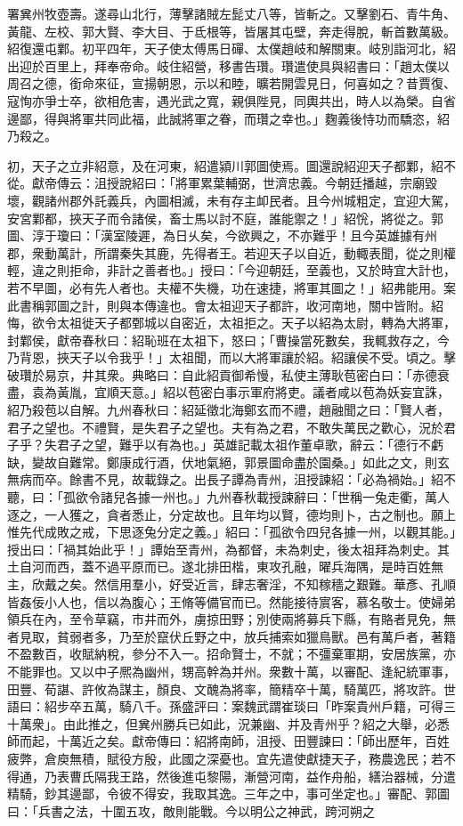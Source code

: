 \begin{pinyinscope}
署兾州牧壺壽。遂尋山北行，薄擊諸賊左髭丈八等，皆斬之。又擊劉石、青牛角、黃龍、左校、郭大賢、李大目、于氐根等，皆屠其屯壁，奔走得脫，斬首數萬級。紹復還屯鄴。初平四年，天子使太傅馬日磾、太僕趙岐和解關東。岐別詣河北，紹出迎於百里上，拜奉帝命。岐住紹營，移書告瓚。瓚遣使具與紹書曰：「趙太僕以周召之德，銜命來征，宣揚朝恩，示以和睦，曠若開雲見日，何喜如之？昔賈復、寇恂亦爭士卒，欲相危害，遇光武之寬，親俱陛見，同輿共出，時人以為榮。自省邊鄙，得與將軍共同此福，此誠將軍之眷，而瓚之幸也。」麴義後恃功而驕恣，紹乃殺之。

初，天子之立非紹意，及在河東，紹遣潁川郭圖使焉。圖還說紹迎天子都鄴，紹不從。獻帝傳云：沮授說紹曰：「將軍累葉輔弼，世濟忠義。今朝廷播越，宗廟毀壞，觀諸州郡外託義兵，內圖相滅，未有存主卹民者。且今州城粗定，宜迎大駕，安宮鄴都，挾天子而令諸侯，畜士馬以討不庭，誰能禦之！」紹恱，將從之。郭圖、淳于瓊曰：「漢室陵遲，為日乆矣，今欲興之，不亦難乎！且今英雄據有州郡，衆動萬計，所謂秦失其鹿，先得者王。若迎天子以自近，動輙表聞，從之則權輕，違之則拒命，非計之善者也。」授曰：「今迎朝廷，至義也，又於時宜大計也，若不早圖，必有先人者也。夫權不失機，功在速捷，將軍其圖之！」紹弗能用。案此書稱郭圖之計，則與本傳違也。會太祖迎天子都許，收河南地，關中皆附。紹悔，欲令太祖徙天子都鄄城以自密近，太祖拒之。天子以紹為太尉，轉為大將軍，封鄴侯，獻帝春秋曰：紹恥班在太祖下，怒曰；「曹操當死數矣，我輒救存之，今乃背恩，挾天子以令我乎！」太祖聞，而以大將軍讓於紹。紹讓侯不受。頃之。擊破瓚於易京，井其衆。典略曰：自此紹貢御希慢，私使主薄耿苞密白曰：「赤德衰盡，袁為黃胤，宜順天意。」紹以苞密白事示軍府將吏。議者咸以苞為妖妄宜誅，紹乃殺苞以自解。九州春秋曰：紹延徵北海鄭玄而不禮，趙融聞之曰：「賢人者，君子之望也。不禮賢，是失君子之望也。夫有為之君，不敢失萬民之歡心，況於君子乎？失君子之望，難乎以有為也。」英雄記載太祖作董卓歌，辭云：「德行不虧缺，變故自難常。鄭康成行酒，伏地氣絕，郭景圖命盡於園桑。」如此之文，則玄無病而卒。餘書不見，故載錄之。出長子譚為青州，沮授諫紹：「必為禍始。」紹不聽，曰：「孤欲令諸兒各據一州也。」九州春秋載授諫辭曰：「世稱一兔走衢，萬人逐之，一人獲之，貪者悉止，分定故也。且年均以賢，德均則卜，古之制也。願上惟先代成敗之戒，下思逐兔分定之義。」紹曰：「孤欲令四兒各據一州，以觀其能。」授出曰：「禍其始此乎！」譚始至青州，為都督，未為刺史，後太祖拜為刺史。其土自河而西，蓋不過平原而已。遂北排田楷，東攻孔融，曜兵海隅，是時百姓無主，欣戴之矣。然信用羣小，好受近言，肆志奢淫，不知稼穡之艱難。華彥、孔順皆姦佞小人也，信以為腹心；王脩等備官而已。然能接待賔客，慕名敬士。使婦弟領兵在內，至令草竊，巿井而外，虜掠田野；別使兩將募兵下縣，有賂者見免，無者見取，貧弱者多，乃至於竄伏丘野之中，放兵捕索如獵鳥獸。邑有萬戶者，著籍不盈數百，收賦納稅，參分不入一。招命賢士，不就；不彊棄軍期，安居族黨，亦不能罪也。又以中子熈為幽州，甥高幹為并州。衆數十萬，以審配、逢紀統軍事，田豐、荀諶、許攸為謀主，顏良、文醜為將率，簡精卒十萬，騎萬匹，將攻許。世語曰：紹步卒五萬，騎八千。孫盛評曰：案魏武謂崔琰曰「昨案貴州戶籍，可得三十萬衆」。由此推之，但兾州勝兵已如此，況兼幽、并及青州乎？紹之大舉，必悉師而起，十萬近之矣。獻帝傳曰：紹將南師，沮授、田豐諫曰：「師出歷年，百姓疲弊，倉庾無積，賦役方殷，此國之深憂也。宜先遣使獻捷天子，務農逸民；若不得通，乃表曹氏隔我王路，然後進屯黎陽，漸營河南，益作舟船，繕治器械，分遣精騎，鈔其邊鄙，令彼不得安，我取其逸。三年之中，事可坐定也。」審配、郭圖曰：「兵書之法，十圍五攻，敵則能戰。今以明公之神武，跨河朔之
\end{pinyinscope}
